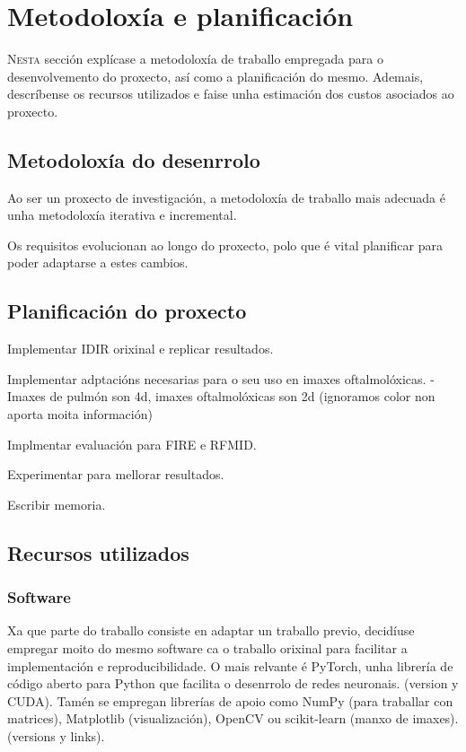 \chapter{Metodoloxía e planificación}
\label{chap:Metodoloxía e planificación}
\lettrine{N}{esta} sección explícase a metodoloxía de traballo empregada para o desenvolvemento do proxecto, así como a planificación do mesmo.
 Ademais, descríbense os recursos utilizados e faise unha estimación dos custos asociados ao proxecto.

\section{Metodoloxía do desenrrolo}
\label{sec:Metodoloxía do desenrrolo}

Ao ser un proxecto de investigación, a metodoloxía de traballo mais adecuada é unha metodoloxía iterativa e incremental.

Os requisitos evolucionan ao longo do proxecto, polo que é vital planificar para poder adaptarse a estes cambios.


\section{Planificación do proxecto}
\label{sec:Planificación do proxecto}

Implementar IDIR orixinal e replicar resultados.

Implementar adptacións necesarias para o seu uso en imaxes oftalmolóxicas.
    - Imaxes de pulmón son 4d, imaxes oftalmolóxicas son 2d (ignoramos color non aporta moita información)

Implmentar evaluación para FIRE e RFMID.

Experimentar para mellorar resultados.

Escribir memoria.

\section{Recursos utilizados}
\label{sec:Recursos utilizados}

\subsection{Software}
\label{subsec:Software}

Xa que parte do traballo consiste en adaptar un traballo previo, 
decidíuse empregar moito do mesmo software ca o traballo orixinal para facilitar a implementación e reproducibilidade.
O mais relvante é PyTorch, unha librería de código aberto para Python que facilita o desenrrolo de redes neuronais.
(version y CUDA). Tamén se empregan librerías de apoio como NumPy (para traballar con matrices), Matplotlib (visualización), OpenCV ou scikit-learn (manxo de imaxes).
(versions y links).

